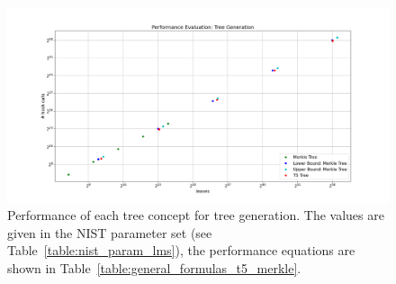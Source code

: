 \begin{figure}
\centering
\includegraphics[width=\linewidth]{images/Evaluation/performance_tree_generation.png}
\caption{Performance of each tree concept for tree generation. The values are given in the NIST parameter set (see Table~\ref{table:nist_param_lms}), the performance equations are shown in Table~\ref{table:general_formulas_t5_merkle}.}
\label{img:performance_tree_gen}
\end{figure}




